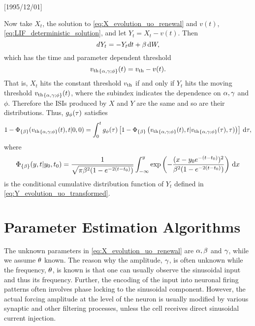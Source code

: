 \NeedsTeXFormat{LaTeX2e}[1995/12/01] \documentclass[10pt]{bmc_article}
\newenvironment{bmcformat}{\begin{raggedright}\baselineskip20pt\sloppy\setboolean{publ}{false}}{\end{raggedright}\baselineskip20pt\sloppy}
\begin{document}
\begin{bmcformat}
Now take $X_t$, the solution to \cref{eq:X_evolution_uo_renewal} and
$v(t)$, \cref{eq:LIF_deterministic_solution}, and 
let $Y_t = X_t - v(t)$. Then
\begin{equation}
dY_t = -Y_t dt + {\beta} \, \mathrm{d} W,
\label{eq:Y_evolution_uo_transformed}
\end{equation}
which has the time and parameter dependent threshold
\begin{equation}
{ v_{\textrm{th} } }_{\{{\alpha},{\gamma };\phi\}}(t) = { v_{\textrm{th} } } - v(t).
\end{equation}
That is, $X_t$ hits the constant threshold ${ v_{\textrm{th} } }$ if and only if $Y_t$ hits the
moving threshold ${ v_{\textrm{th} } }_{\{{\alpha},{\gamma };\phi\}}(t)$, where the subindex
indicates the dependence on ${\alpha},{\gamma }$ and $\phi$. Therefore the ISIs produced by $X$ and $Y$
are the same and so are their distributions. Thus, $g_\phi({\tau})$ satisfies
\begin{equation}
1 - {\Phi}_{\{{\beta}\}}({ v_{\textrm{th} } }_{\{{\alpha},{\gamma };\phi\}} (t), t|0, 0) =
\int_0^t g_{\phi} (\tau)
\left[1-{\Phi}_{\{{\beta}\}} \left({ v_{\textrm{th} } }_{\{{\alpha},{\gamma };\phi\}} (t),  t|
						  { v_{\textrm{th} } }_{\{{\alpha},{\gamma };\phi\}} ({\tau}), {\tau} ) \right)
      \right] \, \mathrm{d} {\tau},
\label{eq:Fortet_moving_vth}
\end{equation}
where 
$$
{\Phi}_{\{{\beta}\}}(y,t| y_0, t_0) = \frac{1}{ \sqrt{\pi {\beta}^2(1-e^{-2(t-t_0)}) }}
\int_{-\infty}^{y} \exp \left( -\frac{(x - y_0e^{-(t-t_0)})^2}
							         {{\beta}^2(1-e^{-2(t-t_0)})} \right) \, \mathrm{d} x
$$
is the conditional cumulative distribution function of $Y_t$ defined in
\cref{eq:Y_evolution_uo_transformed}.

\section{Parameter Estimation Algorithms}
\label{sec:estimation_algos}
The unknown parameters in \cref{eq:X_evolution_uo_renewal} are ${\alpha},{\beta}$ and ${\gamma }$,
while we assume ${\theta}$ known. The reason why the amplitude, ${\gamma }$, is often
unknown while the frequency, ${\theta}$, is known is that one can usually observe the
sinusoidal input and thus its frequency. Further, the encoding of the input into
neuronal firing patterns often involves phase locking to the sinusoidal
component. However, the actual forcing amplitude at the level of the neuron is
usually modified by various synaptic and other filtering processes, unless the
cell receives direct sinusoidal current injection.


\end{bmcformat}
\end{document}
